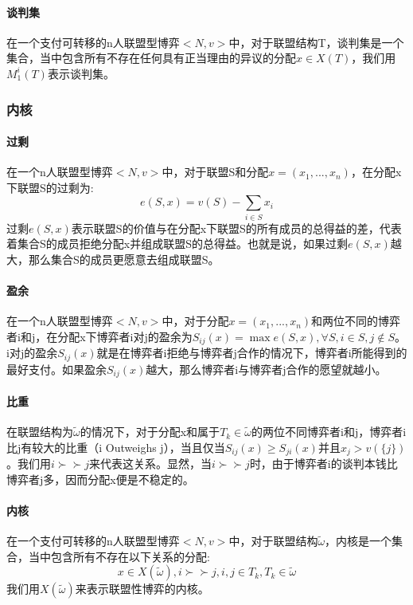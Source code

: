 \documentclass[12pt,a4paper]{article}
\begin{document}
\paragraph{谈判集} 在一个支付可转移的n人联盟型博弈$<N,v>$中，对于联盟结构T，谈判集是一个集合，当中包含所有不存在任何具有正当理由的异议的分配$x \in X(T)$，我们用$M_1^i(T)$表示谈判集。

\subsubsection{内核}
\paragraph{过剩} 在一个n人联盟型博弈$<N,v>$中，对于联盟S和分配$x=(x_1,...,x_n)$，在分配x下联盟S的过剩为:
\begin{equation}
	e(S,x)=v(S)-\sum_{i \in S}x_i
\end{equation}
过剩$e(S,x)$表示联盟S的价值与在分配x下联盟S的所有成员的总得益的差，代表着集合S的成员拒绝分配x并组成联盟S的总得益。也就是说，如果过剩$e(S,x)$越大，那么集合S的成员更愿意去组成联盟S。
\paragraph{盈余} 在一个n人联盟型博弈$<N,v>$中，对于分配$x=(x_1,...,x_n)$和两位不同的博弈者i和j，在分配x下博弈者i对j的盈余为$S_{ij}(x)=\max e(S,x), \forall S, i\in S, j\notin S$。i对j的盈余$S_{ij}(x)$就是在博弈者i拒绝与博弈者j合作的情况下，博弈者i所能得到的最好支付。如果盈余$S_{ij}(x)$越大，那么博弈者i与博弈者j合作的愿望就越小。
\paragraph{比重} 在联盟结构为$\tilde{\omega}$的情况下，对于分配x和属于$T_k \in \tilde{\omega}$的两位不同博弈者i和j，博弈者i比j有较大的比重（i Outweighs j），当且仅当$S_{ij}(x)\geq S_{ji}(x)$并且$x_j>v(\{j\})$。我们用$i\succ \succ j$来代表这关系。显然，当$i\succ \succ j$时，由于博弈者i的谈判本钱比博弈者j多，因而分配x便是不稳定的。

\paragraph{内核} 在一个支付可转移的n人联盟型博弈$<N,v>$中，对于联盟结构$\tilde{\omega}$，内核是一个集合，当中包含所有不存在以下关系的分配:
\begin{equation}
	x \in X(\tilde{\omega}), i \succ \succ j, i,j \in T_k, T_k \in \tilde{\omega}
\end{equation}
我们用$X(\tilde{\omega})$来表示联盟性博弈的内核。
\end{document}
